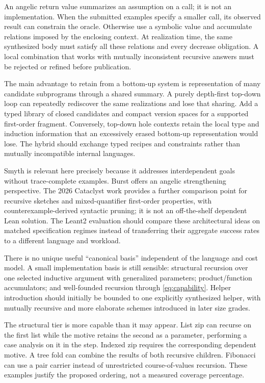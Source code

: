 An angelic return value summarizes an assumption on a call; it is not an implementation. When the submitted examples specify a smaller call, its observed result can constrain the oracle. Otherwise use a symbolic value and accumulate relations imposed by the enclosing context. At realization time, the same synthesized body must satisfy all these relations and every decrease obligation. A local combination that works with mutually inconsistent recursive answers must be rejected or refined before publication.

The main advantage to retain from a bottom-up system is representation of many candidate subprograms through a shared summary. A purely depth-first top-down loop can repeatedly rediscover the same realizations and lose that sharing. Add a typed library of closed candidates and compact version spaces for a supported first-order fragment. Conversely, top-down hole contexts retain the local type and induction information that an excessively erased bottom-up representation would lose. The hybrid should exchange typed recipes and constraints rather than mutually incompatible internal languages.

Smyth is relevant here precisely because it addresses interdependent goals without trace-complete examples. Burst offers an angelic strengthening perspective. The 2026 Cataclyst work provides a further comparison point for recursive sketches and mixed-quantifier first-order properties, with counterexample-derived syntactic pruning; it is not an off-the-shelf dependent Lean solution.\cite{smyth,burst,cataclyst} The Leant2 evaluation should compare these architectural ideas on matched specification regimes instead of transferring their aggregate success rates to a different language and workload.


\answer There is no unique useful ``canonical basis'' independent of the language and cost model. A small implementation basis is still sensible: structural recursion over one selected inductive argument with generalized parameters; product/function accumulators; and well-founded recursion through \cref{eq:capability}. Helper introduction should initially be bounded to one explicitly synthesized helper, with mutually recursive and more elaborate schemes introduced in later size grades.

The structural tier is more capable than it may appear. List zip can recurse on the first list while the motive retains the second as a parameter, performing a case analysis on it in the step. Indexed zip requires the corresponding dependent motive. A tree fold can combine the results of both recursive children. Fibonacci can use a pair carrier instead of unrestricted course-of-values recursion. These examples justify the proposed ordering, not a measured coverage percentage.

